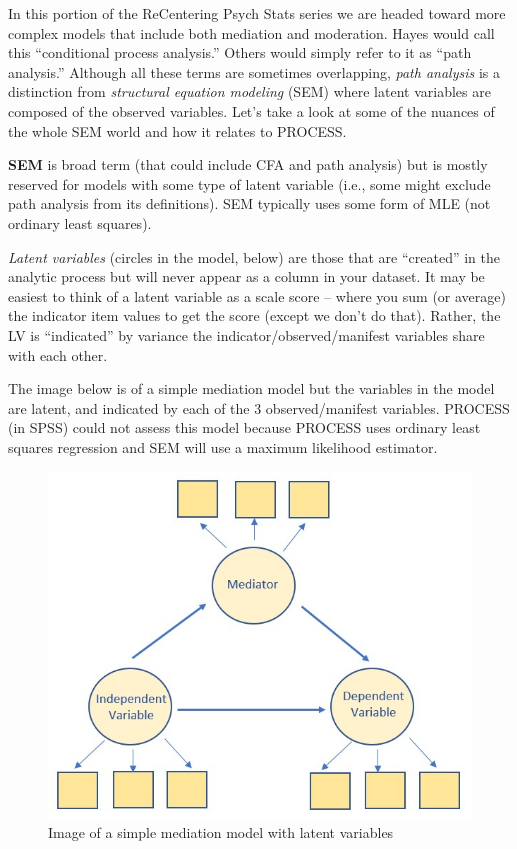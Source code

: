 \documentclass[
]{book}
\begin{document}
In this portion of the ReCentering Psych Stats series we are headed toward more complex models that include both mediation and moderation. Hayes \citep{hayes_introduction_2018} would call this ``conditional process analysis.'' Others would simply refer to it as ``path analysis.'' Although all these terms are sometimes overlapping, \emph{path analysis} is a distinction from \emph{structural equation modeling} (SEM) where latent variables are composed of the observed variables. Let's take a look at some of the nuances of the whole SEM world and how it relates to PROCESS.

\textbf{SEM} is broad term (that could include CFA and path analysis) but is mostly reserved for models with some type of latent variable (i.e., some might exclude path analysis from its definitions). SEM typically uses some form of MLE (not ordinary least squares).

\emph{Latent variables} (circles in the model, below) are those that are ``created'' in the analytic process but will never appear as a column in your dataset. It may be easiest to think of a latent variable as a scale score -- where you sum (or average) the indicator item values to get the score (except we don't do that). Rather, the LV is ``indicated'' by variance the indicator/observed/manifest variables share with each other.

The image below is of a simple mediation model but the variables in the model are latent, and indicated by each of the 3 observed/manifest variables. PROCESS (in SPSS) could not assess this model because PROCESS uses ordinary least squares regression and SEM will use a maximum likelihood estimator.

\begin{figure}
\centering
\includegraphics{images/SimpleMod/SimpleMedLV.jpg}
\caption{Image of a simple mediation model with latent variables}
\end{figure}
\end{document}
